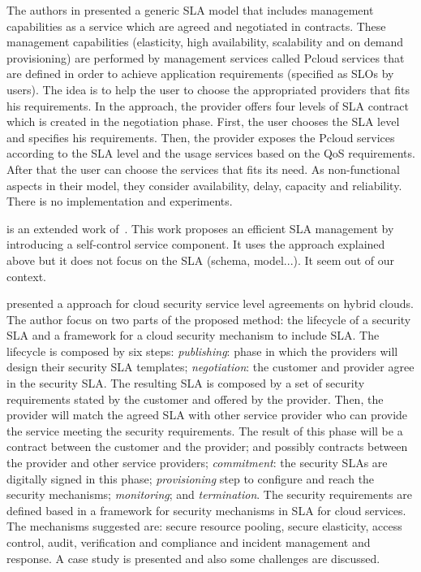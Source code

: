 \documentclass[12pt,a4paper,oneside]{article}
\begin{document}
\bigskip
The authors in \cite{009} presented a generic SLA model that includes management capabilities as a service which are agreed and negotiated in contracts. These management capabilities (elasticity, high availability, scalability and on demand provisioning) are performed by management services called Pcloud services that are defined in order to achieve application requirements (specified as SLOs by users). The idea is to help the user to choose the appropriated providers that fits his requirements. In the approach, the provider offers four levels of SLA contract which is created in the negotiation phase. First, the user chooses the SLA level and specifies his requirements. Then, the provider exposes the Pcloud services according to the SLA level and the usage services based on the QoS requirements. After that the user can choose the services that fits its need. As non-functional aspects in their model, they consider availability, delay, capacity and reliability. There is no implementation and experiments.

\bigskip
\cite{008} is an extended work of~\cite{009}. This work proposes an efficient SLA management by introducing a self-control service component. It uses the approach explained above but it does not focus on the SLA (schema, model...). It seem out of our context.

\bigskip
\cite{011} presented a approach for cloud security service level agreements on hybrid clouds. The author focus on two parts of the proposed method: the lifecycle of a security SLA and a framework for a cloud security mechanism to include SLA. The lifecycle is composed by six steps: \textit{publishing}: phase in which the providers will design their security SLA templates; \textit{negotiation}: the customer and provider agree in the security SLA. The resulting SLA is composed by a set of security requirements stated by the customer and offered by the provider. Then, the provider will match the agreed SLA with other service provider who can provide the service meeting the security requirements. The result of this phase will be a contract between the customer and the provider; and possibly contracts between the provider and other service providers; \textit{commitment}: the security SLAs are digitally signed in this phase; \textit{provisioning} step to configure and reach the security mechanisms; \textit{monitoring}; and \textit{termination}. The security requirements are defined based in a framework for security mechanisms in SLA for cloud services. The mechanisms suggested are: secure resource pooling, secure elasticity, access control, audit, verification and compliance and incident management and response. A case study is presented and also some challenges are discussed.
\end{document}
